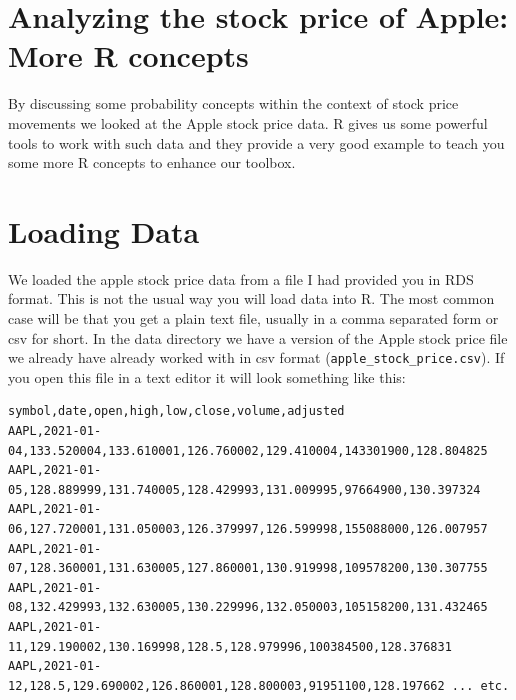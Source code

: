 \documentclass[
]{book}
\begin{document}
\hypertarget{analyzing-the-stock-price-of-apple-more-r-concepts}{%
\section{Analyzing the stock price of Apple: More R concepts}\label{analyzing-the-stock-price-of-apple-more-r-concepts}}

By discussing some probability concepts within the context of stock price movements we looked
at the Apple stock price data. R gives us some powerful tools to work with such data
and they provide a very good example to teach you some more R concepts to enhance
our toolbox.

\hypertarget{loading-data}{%
\section{Loading Data}\label{loading-data}}

We loaded the apple stock price data from a file I had provided you in RDS format. This
is not the usual way you will load data into R. The most common case will be that you
get a plain text file, usually in a comma separated form or csv for short. In the data
directory we have a version of the Apple stock price file we already have already worked with
in csv format (\texttt{apple\_stock\_price.csv}). If you open this file in a text editor it
will look something like this:

\begin{verbatim}
symbol,date,open,high,low,close,volume,adjusted
AAPL,2021-01-04,133.520004,133.610001,126.760002,129.410004,143301900,128.804825
AAPL,2021-01-05,128.889999,131.740005,128.429993,131.009995,97664900,130.397324
AAPL,2021-01-06,127.720001,131.050003,126.379997,126.599998,155088000,126.007957
AAPL,2021-01-07,128.360001,131.630005,127.860001,130.919998,109578200,130.307755
AAPL,2021-01-08,132.429993,132.630005,130.229996,132.050003,105158200,131.432465
AAPL,2021-01-11,129.190002,130.169998,128.5,128.979996,100384500,128.376831
AAPL,2021-01-12,128.5,129.690002,126.860001,128.800003,91951100,128.197662 ... etc.
\end{verbatim}
\end{document}

